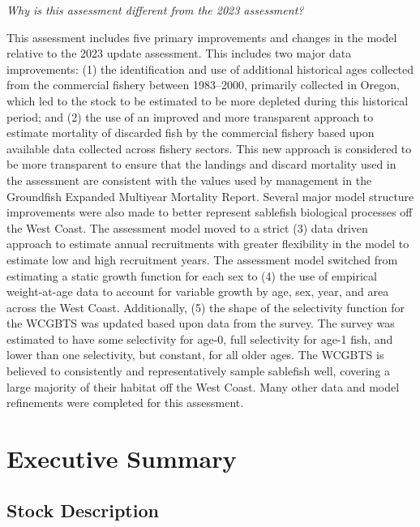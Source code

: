 \documentclass[
  english,
]{article}
\begin{document}
\emph{Why is this assessment different from the 2023 assessment?}

This assessment includes five primary improvements and changes in the
model relative to the 2023 update assessment. This includes two major
data improvements: (1) the identification and use of additional
historical ages collected from the commercial fishery between
1983--2000, primarily collected in Oregon, which led to the stock to be
estimated to be more depleted during this historical period; and (2) the
use of an improved and more transparent approach to estimate mortality
of discarded fish by the commercial fishery based upon available data
collected across fishery sectors. This new approach is considered to be
more transparent to ensure that the landings and discard mortality used
in the assessment are consistent with the values used by management in
the Groundfish Expanded Multiyear Mortality Report. Several major model
structure improvements were also made to better represent sablefish
biological processes off the West Coast. The assessment model moved to a
strict (3) data driven approach to estimate annual recruitments with
greater flexibility in the model to estimate low and high recruitment
years. The assessment model switched from estimating a static growth
function for each sex to (4) the use of empirical weight-at-age data to
account for variable growth by age, sex, year, and area across the West
Coast. Additionally, (5) the shape of the selectivity function for the
WCGBTS was updated based upon data from the survey. The survey was
estimated to have some selectivity for age-0, full selectivity for age-1
fish, and lower than one selectivity, but constant, for all older ages.
The WCGBTS is believed to consistently and representatively sample
sablefish well, covering a large majority of their habitat off the West
Coast. Many other data and model refinements were completed for this
assessment.

\newpage{}

\setcounter{page}{1}

\renewcommand{\thetable}{\roman{table}}
\renewcommand{\thefigure}{\roman{figure}}

\section*{Executive Summary}\label{executive-summary}

\subsection*{Stock Description}\label{stock-description}
\end{document}
